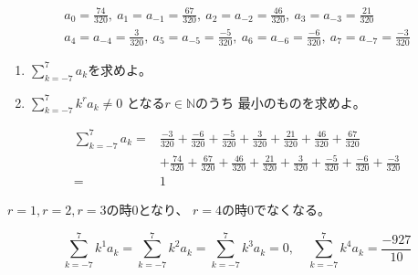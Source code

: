 \documentclass[12pt,b5paper]{ltjsarticle}
\begin{document}



\begin{gather}
 a_0=\frac{74}{320},\
 a_1=a_{-1}=\frac{67}{320},\
 a_2=a_{-2}=\frac{46}{320},\
 a_3=a_{-3}=\frac{21}{320}\\
 a_4=a_{-4}=\frac{3}{320},\
 a_5=a_{-5}=\frac{-5}{320},\
 a_6=a_{-6}=\frac{-6}{320},\
 a_7=a_{-7}=\frac{-3}{320}
\end{gather}

\begin{enumerate}
 \item $\displaystyle \sum_{k=-7}^7a_k$を求めよ。
 \item $\displaystyle \sum_{k=-7}^7 k^r a_k \ne 0$
       となる$r\in\mathbb{N}$のうち
       最小のものを求めよ。
\end{enumerate}

\dotfill

\begin{align}
 \sum_{k=-7}^7a_k
 = &
  \frac{-3}{320}
  + \frac{-6}{320}
  + \frac{-5}{320}
  + \frac{3}{320}
  + \frac{21}{320}
  + \frac{46}{320}
  + \frac{67}{320}\\
 &
  + \frac{74}{320}
  + \frac{67}{320}
  + \frac{46}{320}
  + \frac{21}{320}
  + \frac{3}{320}
  + \frac{-5}{320}
  + \frac{-6}{320}
  + \frac{-3}{320}\\
  =& 1
\end{align}

\dotfill

$r=1,r=2,r=3$の時$0$となり、
$r=4$の時$0$でなくなる。

\begin{equation}
 \sum_{k=-7}^7k^1a_k
  = \sum_{k=-7}^7k^2a_k
  = \sum_{k=-7}^7k^3a_k
  =0,\quad
 \sum_{k=-7}^7k^4a_k
 = \frac{-927}{10}
\end{equation}
\end{document}
